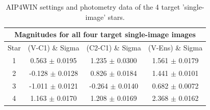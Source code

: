 \documentclass[12pt]{article}
\begin{document}
\begin{table}[H]
\begin{center}
 \begin{tabular}{|c||c|c|c|}
 \hline
 \multicolumn{4}{|c|}{Magnitudes for all four target single-image images} \\
 \hline 
 Star & (V-C1) \& Sigma & (C2-C1) \& Sigma & (V-Ens) \& Sigma\\
 \hline \hline
 1 & 0.563 $\pm$ 0.0195 &  1.235 $\pm$ 0.0300 &  1.561 $\pm$ 0.0179 \\
 \hline
 2 & -0.128 $\pm$ 0.0128 &  0.826 $\pm$ 0.0184 &  1.441 $\pm$ 0.0101 \\
 \hline
 3 & -1.011 $\pm$ 0.0121 &  -0.264 $\pm$ 0.0140 &  0.682 $\pm$ 0.0072 \\
 \hline
 4 & 1.163 $\pm$ 0.0170 &  1.208 $\pm$ 0.0169 &  2.368 $\pm$ 0.0162 \\
 \hline
 \end{tabular} \\
 \caption{AIP4WIN settings and photometry data of the 4 target 'single-image' stars.}
 \label{SI Data}
\end{center}
\end{table} 
\end{document}
